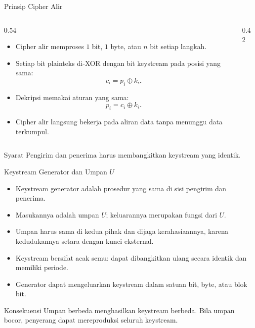 \documentclass[aspectratio=169,11pt]{beamer}
\begin{document}
\begin{frame}{Prinsip Cipher Alir}
    \footnotesize
    \begin{columns}[T,onlytextwidth]
        \begin{column}{0.54\textwidth}
            \begin{itemize}
                \item Cipher alir memproses $1$ bit, $1$ byte, atau $n$ bit
                      setiap langkah.
                \item Setiap bit plainteks di-XOR dengan bit keystream pada
                      posisi yang sama:
                      \[
                          c_i=p_i\oplus k_i .
                      \]
                \item Dekripsi memakai aturan yang sama:
                      \[
                          p_i=c_i\oplus k_i .
                      \]
                \item Cipher alir langsung bekerja pada aliran data tanpa
                      menunggu data terkumpul.
            \end{itemize}
        \end{column}
        \begin{column}{0.42\textwidth}
            \centering
        \end{column}
    \end{columns}
    \vspace{0.1cm}
    \begin{block}{Syarat}
        Pengirim dan penerima harus membangkitkan keystream yang identik.
    \end{block}
\end{frame}

\begin{frame}{Keystream Generator dan Umpan $U$}
    \footnotesize
    \begin{itemize}
        \item Keystream generator adalah prosedur yang sama di sisi pengirim
              dan penerima.
        \item Masukannya adalah umpan $U$; keluarannya merupakan fungsi dari
              $U$.
        \item Umpan harus sama di kedua pihak dan dijaga kerahasiaannya,
              karena kedudukannya setara dengan kunci eksternal.
        \item Keystream bersifat acak semu: dapat dibangkitkan ulang secara
              identik dan memiliki periode.
        \item Generator dapat mengeluarkan keystream dalam satuan bit, byte,
              atau blok bit.
    \end{itemize}
    \begin{exampleblock}{Konsekuensi}
        Umpan berbeda menghasilkan keystream berbeda. Bila umpan bocor,
        penyerang dapat mereproduksi seluruh keystream.
    \end{exampleblock}
\end{frame}
\end{document}
